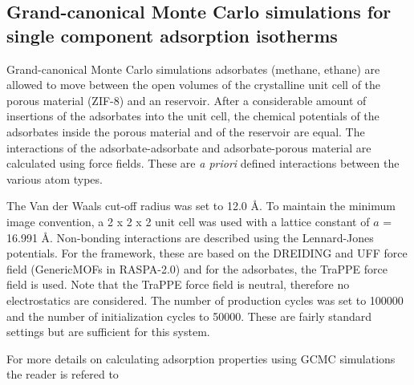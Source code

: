 \documentclass{article}
\begin{document}
\clearpage

\subsection{Grand-canonical Monte Carlo simulations for single component adsorption isotherms}
\label{sec:gcmc_simulations} 
Grand-canonical Monte Carlo simulations adsorbates (methane, ethane) are allowed to move between the open volumes of the crystalline unit cell of the porous material (ZIF-8) and an reservoir. After a considerable amount of insertions of the adsorbates into the unit cell, the chemical potentials of the adsorbates inside the porous material and of the reservoir are equal. The interactions of the adsorbate-adsorbate and adsorbate-porous material are calculated using force fields. These are \textit{a priori} defined interactions between the various atom types.

The Van der Waals cut-off radius was set to 12.0 {\AA}. To maintain the minimum image convention, a 2 x 2 x 2 unit cell was used with a lattice constant of $a$ = 16.991 \AA. Non-bonding interactions are described using the Lennard-Jones potentials. For the framework, these are based on the DREIDING and UFF force field (GenericMOFs in RASPA-2.0) and for the adsorbates, the TraPPE force field is used. Note that the TraPPE force field is neutral, therefore no electrostatics are considered. The number of production cycles was set to 100000 and the number of initialization cycles to 50000. These are fairly standard settings but are sufficient for this system.  

For more details on calculating adsorption properties using GCMC simulations the reader is refered to \cite{Frenkel2001,Dubbeldam2013,Dubbeldam2015}









\end{document}
